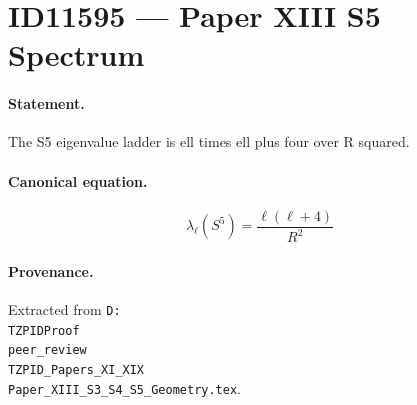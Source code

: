 \section*{ID11595 --- Paper XIII S5 Spectrum}

\paragraph{Statement.}
The S5 eigenvalue ladder is ell times ell plus four over R squared.

\paragraph{Canonical equation.}
\[
\lambda_\ell(S^5)=\frac{\ell(\ell+4)}{R^2}
\]

\paragraph{Provenance.}
Extracted from \texttt{D:\\TZPIDProof\\peer\_review\\TZPID\_Papers\_XI\_XIX\\Paper\_XIII\_S3\_S4\_S5\_Geometry.tex}.
